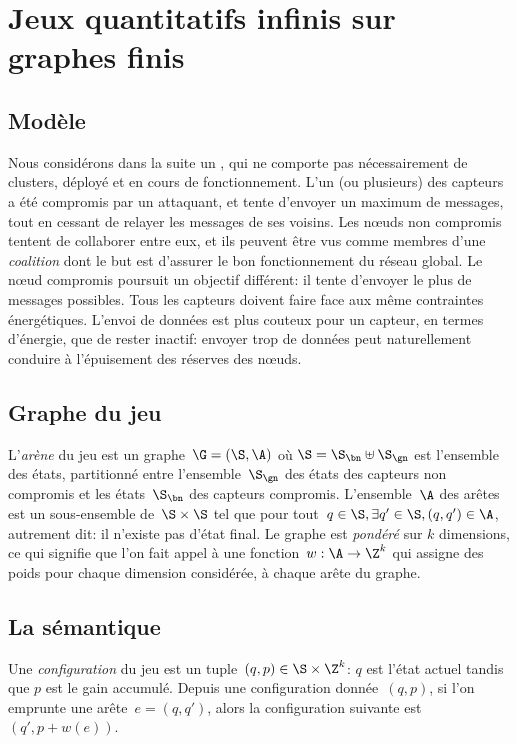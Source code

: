 \section{Jeux quantitatifs infinis sur graphes finis}
\label{tj:sec:model}

\subsection{Modèle}
Nous considérons dans la suite un \rcsf, qui ne comporte pas nécessairement de clusters, déployé et en cours de fonctionnement.
L'un (ou plusieurs) des capteurs a été compromis par un attaquant, et tente d'envoyer un maximum de messages, tout en cessant de relayer les messages de ses voisins.
Les nœuds non compromis tentent de collaborer entre eux, et ils peuvent être vus comme membres d'une \emph{coalition} dont le but est d'assurer le bon fonctionnement du réseau global.
Le nœud compromis poursuit un objectif différent: il tente d'envoyer le plus de messages possibles.
Tous les capteurs doivent faire face aux même contraintes énergétiques.
L'envoi de données est plus couteux pour un capteur, en termes d'énergie, que de rester inactif: envoyer trop de données peut naturellement conduire à l'épuisement des réserves des nœuds.

\subsection{Graphe du jeu}
L'\emph{arène} du jeu est un graphe~$\G = (\S,\A)$ où $\S = \S_\bn \uplus \S_\gn$ est l'ensemble des états, partitionné entre l'ensemble~$\S_\gn$ des états des capteurs non compromis et les états~$\S_\bn$ des capteurs compromis.
L'ensemble~$\A$ des arêtes est un sous-ensemble de~$\S \times \S$ tel que pour tout~$q \in \S, \exists q' \in \S, (q,q')\in \A$, autrement dit: il n'existe pas d'état final.
Le graphe est \emph{pondéré} sur $k$ dimensions, ce qui signifie que l'on fait appel à une fonction~$w: \A \rightarrow \Z^k$ qui assigne des poids pour chaque dimension considérée, à chaque arête du graphe.

\subsection{La sémantique}
Une \emph{configuration} du jeu est un tuple~$(q,p) \in \S \times \Z^k$: $q$ est l'état actuel tandis que $p$ est le gain accumulé.
Depuis une configuration donnée~$(q,p)$, si l'on emprunte une arête~$e=(q,q')$, alors la configuration suivante est $(q',p+w(e))$.

